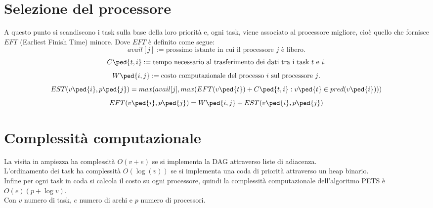 \section{Selezione del processore}
A questo punto si scandiscono i task sulla base della loro priorità e, ogni task, viene associato al processore migliore, cioè quello che fornisce $EFT$ (Earliest Finish Time) minore. 
Dove $EFT$ è definito come segue:
\begin{displaymath}
	avail[j] := \text{prossimo istante in cui il processore $j$ è libero.}
\end{displaymath}
\begin{displaymath}
	C\ped{t,i} := \text{tempo necessario al trasferimento dei dati tra i task $t$ e $i$.} 
\end{displaymath}
\begin{displaymath}
	W\ped{i,j} := \text{costo computazionale del processo $i$ sul processore $j$.} 
\end{displaymath}
\begin{equation}\label{EST}
	EST(v\ped{i},p\ped{j}) = max(avail[j], max(EFT(v\ped{t}) + C\ped{t,i} : v\ped{t} \in pred(v\ped{i})))
\end{equation}
\begin{equation}\label{EFT}
	EFT(v\ped{i},p\ped{j}) = W\ped{i,j} + EST(v\ped{i},p\ped{j})
\end{equation}


\section{Complessità computazionale}
La visita in ampiezza ha complessità $O(v + e)$ se si implementa la DAG attraverso liste di adiacenza.
\\
L'ordinamento dei task ha complessità $O(\log(v))$ se si implementa una coda di priorità attraverso un heap binario.
\\
Infine per ogni task in coda si calcola il costo su ogni processore, quindi la complessità computazionale dell'algoritmo PETS è \( O(e)(p + \log{v}) \).
\\
Con $v$ numero di task, $e$ numero di archi e $p$ numero di processori.